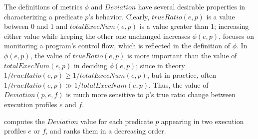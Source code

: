 The definitions of metrics $\phi$ and $Deviation$ have several desirable properties
in characterizing a predicate $p$'s behavior. Clearly, $trueRatio(e,p)$
is a value between 0 and 1 and $totalExecNum(e, p)$ is a value greater than 1; increasing
either value while keeping the other one unchanged increases $\phi(e, p)$.
\ourtool focuses on monitoring a program's control flow, which is reflected
in the definition of $\phi$. In $\phi(e, p)$,
the value of $trueRatio(e, p)$ is more important than the value
of $totalExecNum(e, p)$
in deciding $\phi(e, p)$; since in theory $1/trueRatio(e, p) \geq 1/totalExecNum(e, p)$, but
in practice, often $1/trueRatio(e, p) \gg 1/totalExecNum(e, p)$.
Thus, the value of $Deviation(p, e, f)$ is much more sensitive to $p$'s
true ratio change between execution profiles $e$ and $f$. 




\ourtool computes the $Deviation$ value for each predicate $p$
appearing in two execution profiles $e$ or $f$, and
ranks them in a decreasing order. 







